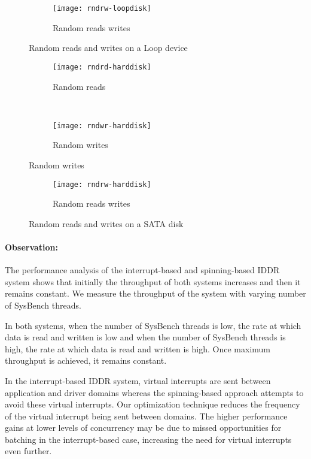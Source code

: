 \begin{figure}[H]
  \ContinuedFloat
  \begin{subfigure}[b]{\textwidth}
  \texttt{[image: rndrw-loopdisk]}
  \caption{Random reads writes}
  \label{subfig:rndrw-loopdisk}
  \end{subfigure}
\caption{Random reads and writes on a Loop device}\label{fig:rndloopdisk}
\end{figure}

\begin{figure}[!ht]
\centering
  \begin{subfigure}[b]{\textwidth}
  \texttt{[image: rndrd-harddisk]}
  \caption{Random reads}
  \label{subfig:rndrd-harddisk}
  \end{subfigure}\\
  \begin{subfigure}[b]{\textwidth}
  \texttt{[image: rndwr-harddisk]}
  \caption{Random writes}
  \label{subfig:rndwr-harddisk}
  \end{subfigure}
\end{figure}

\begin{figure}[H]
  \ContinuedFloat
  \begin{subfigure}[b]{\textwidth}
  \texttt{[image: rndrw-harddisk]}
  \caption{Random reads writes}
  \label{subfig:rndrw-harddisk}
  \end{subfigure}
\caption{Random reads and writes on a SATA disk}\label{fig:rndharddisk}
\end{figure}

\paragraph{Observation:}
The performance analysis of the interrupt-based and spinning-based IDDR system
shows that initially the throughput of both systems increases and then it
remains constant. We measure the throughput of the system with varying
number of SysBench threads.

In both systems, when the number of SysBench threads is low,
the rate at which data is read and written is low and when the number of
SysBench threads is high, the rate at which data is read and written is
high.  Once maximum throughput is achieved, it remains constant.

In the interrupt-based IDDR system, virtual interrupts are sent between
application and driver domains whereas the spinning-based approach
attempts to avoid these virtual interrupts.  
Our optimization technique reduces the frequency of the
virtual interrupt being sent between domains. 
The higher performance gains at lower levels of concurrency
may be due to missed opportunities for batching in the interrupt-based case,
increasing the need for virtual interrupts even further.


